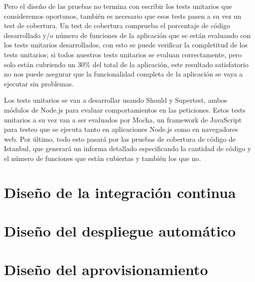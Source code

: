 Pero el diseño de las pruebas no termina con escribir los tests unitarios que consideremos oportunos, también es necesario que
esos tests pasen a su vez un test de cobertura. Un test de cobertura comprueba el porcentaje de código desarrollado y/o
número de funciones de la aplicación que se están evaluando con los tests unitarios desarrollados, con esto se puede verificar
la completitud de los tests unitarios; si todos nuestros tests unitarios se evaluan correctamente, pero solo están cubriendo
un 30\% del total de la aplicación, este resultado satisfatorio no nos puede asegurar que la funcionalidad completa de la 
aplicación se vaya a ejecutar sin problemas.

\bigskip
Los tests unitarios se van a desarrollar usando Should y Supertest, ambos módulos de Node.js para evaluar comportamientos en las
peticiones. Estos tests unitarios a su vez van a ser evaluados por Mocha, un framework de JavaScript para testeo que se ejecuta
tanto en aplicaciones Node.js como en navegadores web. Por último, todo esto pasará por las pruebas de cobertura de código de 
Istanbul, que generará un informa detallado especificando la cantidad de código y el número de funciones que están cubiertas y
también los que no.

\section{Diseño de la integración continua}

\section{Diseño del despliegue automático}

\section{Diseño del aprovisionamiento}